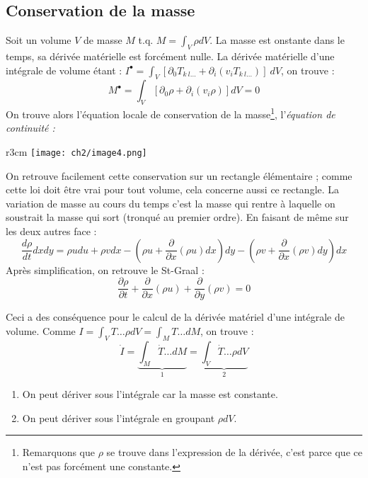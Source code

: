 \subsection{Conservation de la masse} 
Soit un volume $V$ de masse $M$ t.q. $M = \int_V \rho dV$. La masse est onstante dans le temps, sa 
dérivée matérielle est forcément nulle. La dérivée matérielle d'une intégrale de volume étant : $I^
\bullet = \int_V [\partial_0T_{k\ l\dots} + \partial_i(v_iT_{k\ l\dots})]\ dV$, on trouve :
\begin{equation}
	M^\bullet = \int_V [\partial_0\rho + \partial_i(v_i\rho)]dV = 0
\end{equation}
On trouve alors l'équation locale de conservation de la masse\footnote{Remarquons que $\rho$ se trouve
	dans l'expression de la dérivée, c'est parce que ce n'est pas forcément une constante.}, l'\textit{équation 
de continuité :}
\ \\
\begin{wrapfigure}[8]{r}{3cm}
	\texttt{[image: ch2/image4.png]}
\end{wrapfigure}
On retrouve facilement cette conservation sur un rectangle élémentaire ; comme cette loi doit être vrai
pour tout volume, cela concerne aussi ce rectangle. La variation de masse au cours du temps c'est la masse qui
rentre à laquelle on soustrait la masse qui sort (tronqué au premier ordre). En faisant de même sur les
deux autres face :
\begin{equation}
	\frac{d\rho}{dt}dxdy = \rho u du + \rho v dx - \left( \rho u + \frac{\partial}{\partial x}(\rho u)dx\right)
	dy - \left( \rho v + \frac{\partial}{\partial x}(\rho v)dy\right)dx
\end{equation}
Après simplification, on retrouve le St-Graal :
\begin{equation}
	\frac{\partial \rho}{\partial t} + \frac{\partial}{\partial x}(\rho u) + \frac{\partial}{\partial y}(\rho v) = 0
\end{equation}
    
Ceci a des conséquence pour le calcul de la dérivée matériel d'une intégrale de volume. Comme $I = \int_V
T\dots \rho dV = \int_M T\dots dM$, on trouve :
\begin{equation}
	\dot{I} = \underbrace{\int_M \dot{T}\dots dM}_{1} = \underbrace{\int_V \dot{T}\dots\rho dV}_{2}
\end{equation}
\begin{enumerate}
	\item On peut dériver sous l'intégrale car la masse est constante.
	\item On peut dériver sous l'intégrale en groupant $\rho dV$.
\end{enumerate}
    
